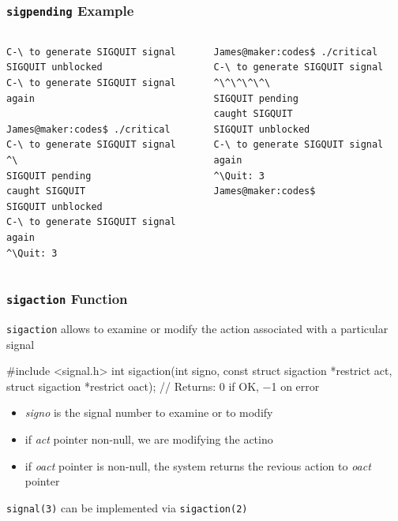 \documentclass[newPxFont,sthlmFooter,nooffset]{beamer}
\begin{document}
\begin{frame}[fragile,t]
  \frametitle{\texttt{sigpending} Example}
\begin{columns}[t]
\begin{column}{0.5\linewidth}
{\footnotesize
\begin{verbatim}
C-\ to generate SIGQUIT signal
SIGQUIT unblocked
C-\ to generate SIGQUIT signal again

James@maker:codes$ ./critical
C-\ to generate SIGQUIT signal
^\
SIGQUIT pending
caught SIGQUIT
SIGQUIT unblocked
C-\ to generate SIGQUIT signal again
^\Quit: 3
\end{verbatim} 
}
\end{column}
\begin{column}{0.5\linewidth}
{\footnotesize
\begin{verbatim}
James@maker:codes$ ./critical
C-\ to generate SIGQUIT signal
^\^\^\^\^\
SIGQUIT pending
caught SIGQUIT
SIGQUIT unblocked
C-\ to generate SIGQUIT signal again
^\Quit: 3
James@maker:codes$
\end{verbatim}
}
\end{column}
\end{columns}



  
\end{frame}


\begin{frame}
  \frametitle{\texttt{sigaction} Function}
\texttt{sigaction} allows to examine or modify the action associated with a particular signal
\begin{codedef}
#include <signal.h>
int sigaction(int signo, const struct sigaction *restrict act,
              struct sigaction *restrict oact);
// Returns: 0 if OK, −1 on error  
\end{codedef}

\begin{itemize}
\item \textit{signo} is the signal number to examine or to modify
\item if \textit{act} pointer non-null, we are modifying the actino
\item if \textit{oact} pointer is non-null, the system returns the revious action to \textit{oact} pointer
\end{itemize}

\texttt{signal(3)} can be implemented via \texttt{sigaction(2)}
\end{frame}
\end{document}
